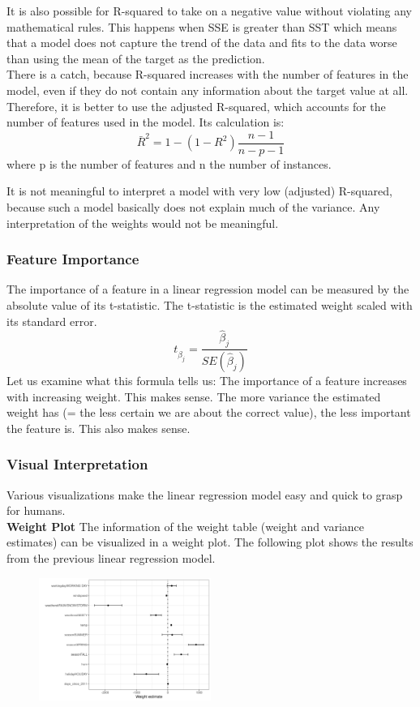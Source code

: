 It is also possible for R-squared to take on a negative value without violating any mathematical rules.
This happens when SSE is greater than SST which means that a model does not capture the trend of the data and fits to the data worse than using the mean of the target as the prediction.\\

There is a catch, because R-squared increases with the number of features in the model, even if they do not contain any information about the target value at all. 
Therefore, it is better to use the adjusted R-squared, which accounts for the number of features used in the model. 
Its calculation is:
\begin{equation*}
    \bar{R}^2=1-(1-R^2)\frac{n-1}{n-p-1}
\end{equation*}
where p is the number of features and n the number of instances.

It is not meaningful to interpret a model with very low (adjusted) R-squared, because such a model basically does not explain much of the variance. Any interpretation of the weights would not be meaningful.

\subsubsection{Feature Importance}
The importance of a feature in a linear regression model can be measured by the absolute value of its t-statistic. 
The t-statistic is the estimated weight scaled with its standard error.
\begin{equation*}
    t_{\hat{\beta}_j}=\frac{\hat{\beta}_j}{SE(\hat{\beta}_j)}
\end{equation*}
Let us examine what this formula tells us: The importance of a feature increases with increasing weight. This makes sense.
The more variance the estimated weight has (= the less certain we are about the correct value), the less important the feature is. 
This also makes sense.
\subsubsection{Visual Interpretation}
Various visualizations make the linear regression model easy and quick to grasp for humans.\\

\textbf{Weight Plot}
The information of the weight table (weight and variance estimates) can be visualized in a weight plot. The following plot shows the results from the previous linear regression model.
\begin{figure}[H]
    \includegraphics[width=0.5\textwidth]{img/linear-weights-plot-1.jpeg}
    \centering
\end{figure}

